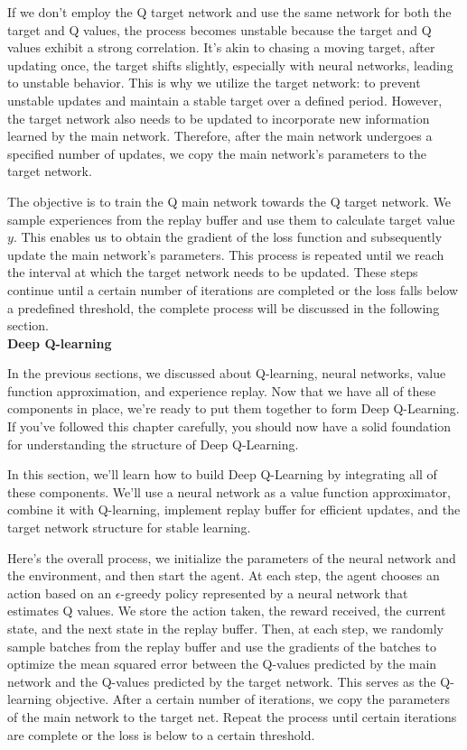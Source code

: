 \documentclass{article}
\begin{document}
If we don't employ the Q target network and use the same network for both the target and Q values, the process becomes unstable because the target and Q values exhibit a strong correlation. It's akin to chasing a moving target, after updating once, the target shifts slightly, especially with neural networks, leading to unstable behavior. This is why we utilize the target network: to prevent unstable updates and maintain a stable target over a defined period. However, the target network also needs to be updated to incorporate new information learned by the main network. Therefore, after the main network undergoes a specified number of updates, we copy the main network's parameters to the target network.

The objective is to train the Q main network towards the Q target network. We sample experiences from the replay buffer and use them to calculate target value $y$. This enables us to obtain the gradient of the loss function and subsequently update the main network's parameters. This process is repeated until we reach the interval at which the target network needs to be updated. These steps continue until a certain number of iterations are completed or the loss falls below a predefined threshold, the complete process will be discussed in the following section.\\


\noindent
\textbf{Deep Q-learning}\\
\noindent

In the previous sections, we discussed about Q-learning, neural networks, value function approximation, and experience replay. Now that we have all of these components in place, we're ready to put them together to form Deep Q-Learning. If you've followed this chapter carefully, you should now have a solid foundation for understanding the structure of Deep Q-Learning.

In this section, we'll learn how to build Deep Q-Learning by integrating all of these components. We'll use a neural network as a value function approximator, combine it with Q-learning, implement replay buffer for efficient updates, and the target network structure for stable learning.

Here's the overall process, we initialize the parameters of the neural network and the environment, and then start the agent. At each step, the agent chooses an action based on an $\epsilon$-greedy policy represented by a neural network that estimates Q values. We store the action taken, the reward received, the current state, and the next state in the replay buffer. Then, at each step, we randomly sample batches from the replay buffer and use the gradients of the batches to optimize the mean squared error between the Q-values predicted by the main network and the Q-values predicted by the target network. This serves as the Q-learning objective. After a certain number of iterations, we copy the parameters of the main network to the target net. Repeat the process until certain iterations are complete or the loss is below to a certain threshold.
\end{document}
